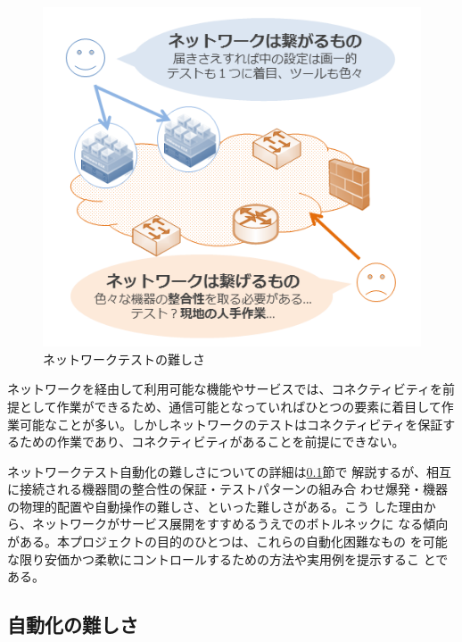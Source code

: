 \begin{figure}
 \vspace*{-3zw}
 \includegraphics[scale=0.5]{img/difficulty-of-network-testing.png}
 \caption{ネットワークテストの難しさ}
 \label{fig:difficulty-of-network-testing}
\end{figure}

ネットワークを経由して利用可能な機能やサービスでは、コネクティビティを前
提として作業ができるため、通信可能となっていればひとつの要素に着目して作
業可能なことが多い。しかしネットワークのテストはコネクティビティを保証す
るための作業であり、コネクティビティがあることを前提にできない。

ネットワークテスト自動化の難しさについての詳細は\ref{sec:difficulty}節で
解説するが、相互に接続される機器間の整合性の保証・テストパターンの組み合
わせ爆発・機器の物理的配置や自動操作の難しさ、といった難しさがある。こう
した理由から、ネットワークがサービス展開をすすめるうえでのボトルネックに
なる傾向がある。本プロジェクトの目的のひとつは、これらの自動化困難なもの
を可能な限り安価かつ柔軟にコントロールするための方法や実用例を提示するこ
とである。

  \subsection{自動化の難しさ}
  \label{sec:difficulty}

